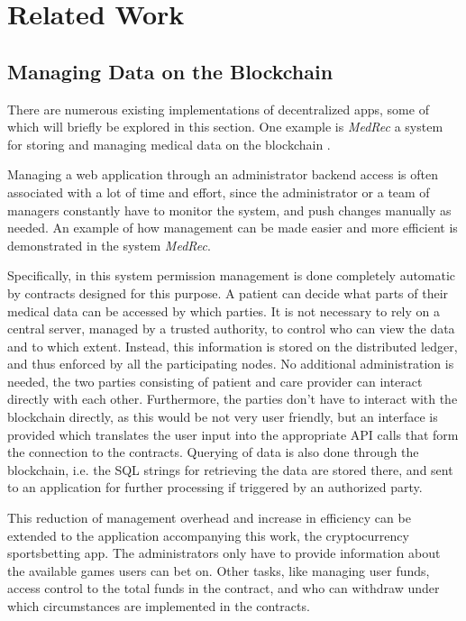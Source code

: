 \chapter{Related Work}
\label{cha:related_work}
\section{Managing Data on the Blockchain}
There are numerous existing implementations of decentralized apps, some of which will briefly be explored in this section. One example is \emph{MedRec} a system for storing and managing medical data on the blockchain \cite{azaria2016medrec}.

Managing a web application through an administrator backend access is often associated with a lot of time and effort, since the administrator or a team of managers constantly have to monitor the system, and push changes manually as needed. An example of how management can be made easier and more efficient is demonstrated in the system \emph{MedRec}.

Specifically, in this system permission management is done completely automatic by contracts designed for this purpose. A patient can decide what parts of their medical data can be accessed by which parties. It is not necessary to rely on a central server, managed by a trusted authority, to control who can view the data and to which extent. Instead, this information is stored on the distributed ledger, and thus enforced by all the participating nodes. No additional administration is needed, the two parties consisting of patient and care provider can interact directly with each other. Furthermore, the parties don't have to interact with the blockchain directly, as this would be not very user friendly, but an interface is provided which translates the user input into the appropriate API calls that form the connection to the contracts. Querying of data is also done through the blockchain, i.e. the SQL strings for retrieving the data are stored there, and sent to an application for further processing if triggered by an authorized party.

This reduction of management overhead and increase in efficiency can be extended to the application accompanying this work, the cryptocurrency sportsbetting app. The administrators only have to provide information about the available games users can bet on. Other tasks, like managing user funds, access control to the total funds in the contract, and who can withdraw under which circumstances are implemented in the contracts.

